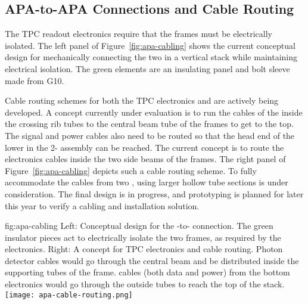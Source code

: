 \subsection{APA-to-APA Connections and Cable Routing}
\label{sec:fdsp-apa-intfc-apa}

The TPC readout electronics require that the  frames must be electrically isolated.  The left panel of Figure~\ref{fig:apa-cabling} shows the current conceptual design for mechanically connecting the two  in a vertical stack while maintaining electrical isolation.  The green elements are an insulating panel and bolt sleeve made from G10. 

Cable routing schemes for both the TPC electronics and  are actively being developed.  A concept currently under evaluation is to run the cables of the  inside the crossing rib tubes to the central beam tube of the  frames to get to the top.  The  signal and power cables also need to be routed so that the head end of the lower  in the 2- assembly can be reached. The current concept is to route the electronics cables inside the two side beams of the  frames. The right panel of Figure~\ref{fig:apa-cabling} depicts such a cable routing scheme. To fully accommodate the cables from two , %
using larger hollow tube sections is under consideration. The final design is in progress, and prototyping is planned for later this year to verify a cabling and installation solution.     

\begin{dunefigure}{fig:apa-cabling}
{Left: Conceptual design for the -to- connection.  The green insulator pieces act to electrically isolate the two frames, as required by the  electronics.  Right: A concept for TPC electronics and  cable routing. Photon detector cables would go through the central beam and be distributed inside the supporting tubes of the  frame.   cables (both data and power) from the bottom  electronics would go through the outside tubes to reach the top of the stack.}
\setlength{\fboxsep}{0pt}
\setlength{\fboxrule}{0.5pt}
\qquad \quad
\texttt{[image: apa-cable-routing.png]}
\end{dunefigure}
